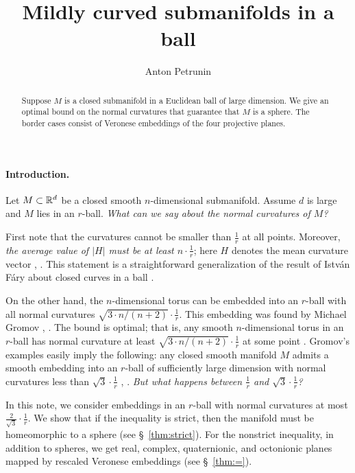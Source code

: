 \documentclass[a4paper,10pt]{article}
\def\thetitle{Mildly curved submanifolds in a ball}
\def\theauthors{Anton Petrunin}
\begin{document}


\title{\thetitle}
\author{\theauthors}
\date{}
\maketitle

\begin{abstract}
Suppose $M$ is a closed submanifold in a Euclidean ball of large dimension.
We give an optimal bound on the normal curvatures that guarantee that $M$ is a sphere.
The border cases consist of Veronese embeddings of the four projective planes.
\end{abstract}

\paragraph{Introduction.} Let $M\subset \mathbb{R}^d$ be a closed smooth $n$-dimensional submanifold.
Assume $d$ is large and $M$ lies in an $r$-ball.
\textit{What can we say about the normal curvatures of $M$?}

First note that the curvatures cannot be smaller than $\tfrac1r$ at all points.
Moreover, 
\textit{the average value of $|H|$ must be at least $n\cdot\tfrac1r$};
here $H$ denotes the mean curvature vector \cite[28.2.5]{burago-zalgaller}, \cite[3.1]{petrunin2024a}.
This statement is a straightforward generalization of the result of István Fáry about closed curves in a ball \cite{fary,tabachnikov}.

On the other hand, the $n$-dimensional torus can be embedded into an $r$-ball with all normal curvatures $\sqrt{3\cdot n/(n+2)}\cdot\tfrac1r$.
This embedding was found by Michael Gromov
\cite[2.A]{gromov3}, \cite[1.1.A]{gromov2}.
The bound is optimal; that is, any smooth $n$-dimensional torus in an $r$-ball has normal curvature at least $\sqrt{3\cdot n/(n+2)}\cdot\tfrac1r$ at some point
\cite{petrunin2024a}.
Gromov's examples easily imply the following:
any closed smooth manifold $M$ admits a smooth embedding into an $r$-ball of sufficiently large dimension with normal curvatures less than $\sqrt{3}\cdot\tfrac1r$
\cite[1.D]{gromov3}, \cite[1.1.C]{gromov2}.
\textit{But what happens between $\tfrac1r$ and  $\sqrt{3}\cdot\tfrac1r$?}

In this note, we consider embeddings in an $r$-ball with normal curvatures at most $\tfrac2{\sqrt{3}}\cdot \tfrac1r$.
We show that if the inequality is strict, then the manifold must be homeomorphic to a sphere (see §~\ref{thm:strict}).
For the nonstrict inequality, in addition to spheres, we get real, complex, quaternionic, and octonionic planes mapped by rescaled Veronese embeddings (see §~\ref{thm:=}).
\end{document}
